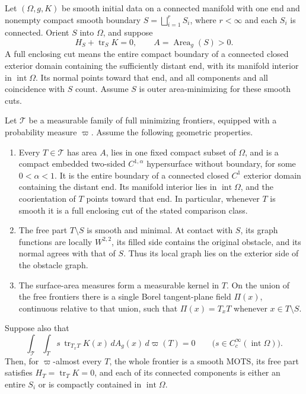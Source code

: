 \begin{proposition}
\label{prop:variation:smooth-localization}
Let $(\Omega,g,K)$ be smooth initial data on a connected manifold with
one end and nonempty compact smooth boundary
$S=\bigsqcup_{i=1}^r S_i$, where $r<\infty$ and each $S_i$ is connected.
Orient $S$ into $\Omega$, and suppose
\[
 H_S+\operatorname{tr}_S K=0,\qquad A=\operatorname{Area}_g(S)>0.
\]
A full enclosing cut means the entire compact boundary of a connected
closed exterior domain containing the sufficiently distant end, with
its manifold interior in $\operatorname{int}\Omega$. Its normal points
toward that end, and all components and all coincidence with $S$ count.
Assume $S$ is outer area-minimizing for these smooth cuts.

Let $\mathcal T$ be a measurable family of full minimizing frontiers,
equipped with a probability measure $\varpi$. Assume the following
geometric properties.
\begin{enumerate}
\item Every $T\in\mathcal T$ has area $A$, lies in one fixed compact
subset of $\Omega$, and is a compact embedded two-sided
$C^{1,\alpha}$ hypersurface without boundary, for some $0<\alpha<1$.
It is the entire boundary of a connected closed $C^1$ exterior domain
containing the distant end. Its manifold interior lies in
$\operatorname{int}\Omega$, and the coorientation of $T$ points toward
that end. In particular, whenever $T$ is smooth it is a full enclosing
cut of the stated comparison class.
\item The free part $T\setminus S$ is smooth and minimal. At contact
with $S$, its graph functions are locally $W^{2,2}$, its filled side
contains the original obstacle, and its normal agrees with that of $S$.
Thus its local graph lies on the exterior side of the obstacle graph.
\item The surface-area measures form a measurable kernel in $T$.
On the union of the free frontiers there is a single Borel tangent-plane
field $\Pi(x)$, continuous relative to that union, such that
$\Pi(x)=T_xT$ whenever $x\in T\setminus S$.
\end{enumerate}
Suppose also that
\begin{equation}
 \int_{\mathcal T}\int_T s\,\operatorname{tr}_{T_xT}K(x)
                   \,dA_g(x)\,d\varpi(T)=0
 \qquad\bigl(s\in C_c^\infty(\operatorname{int}\Omega)\bigr).
 \label{eq:variation:smooth-aggregate-trace}
\end{equation}
Then, for $\varpi$-almost every $T$, the whole frontier is a smooth
MOTS, its free part satisfies $H_T=\operatorname{tr}_T K=0$, and each
of its connected components is either an entire $S_i$ or is compactly
contained in $\operatorname{int}\Omega$.


\end{proposition}
